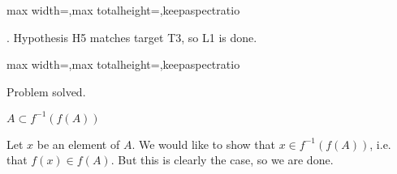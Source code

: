 \documentclass[a4paper,twoside,12pt]{article}
\makeatletter
\DeclareRobustCommand{\_}{%
  \leavevmode\vbox{%
    \hrule\@width.4em
          \@height-.16ex
          \@depth\dimexpr.16ex+.28pt\relax}}
\newcommand\Tstrut{\rule{0pt}{2.4ex}}
\newcommand\Bstrut{\rule[-1.1ex]{0pt}{0pt}}
\newenvironment{fit}{\begin{adjustbox}{max width=\textwidth,max totalheight=\textheight,keepaspectratio}}{\end{adjustbox}}
\makeatother
\begin{document}
\begin{steps}
\begin{fit}
%
\end{fit}
\smallskip

. Hypothesis H5 matches target T3, so L1 is done.\nopagebreak[4] 
\nopagebreak[4] 
\smallskip\nopagebreak[4] 

\begin{fit}%
\end{fit}

Problem solved.
\cleardoublepage

\end{steps}
{\begin{center} \large \textbf{$A \subset f^{-1}(f(A))$}\end{center}}\nopagebreak[4]

\begin{center}
\begin{minipage}{120mm}
Let $x$ be an element of $A$. We would like to show that $x\in f^{-1}(f(A))$, i.e. that $f(x)\in f(A)$. But this is clearly the case, so we are done.
\end{minipage}
\end{center}
\end{document}
